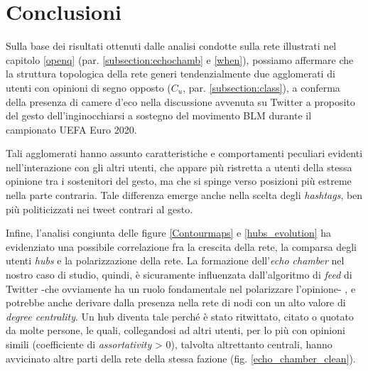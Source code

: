 \section{Conclusioni}

    Sulla base dei risultati ottenuti dalle analisi condotte sulla rete illustrati nel capitolo \ref{openq} (par. \ref{subsection:echochamb} e \ref{when}), possiamo affermare che la struttura topologica della rete generi tendenzialmente due agglomerati di utenti con opinioni di segno opposto ($C_{u}$, par. \ref{subsection:class}), a conferma della presenza di camere d'eco nella discussione avvenuta su Twitter a proposito del gesto dell'inginocchiarsi a sostegno del movimento BLM durante il campionato UEFA Euro 2020. 
    
    Tali agglomerati hanno assunto caratteristiche e comportamenti peculiari evidenti nell'interazione con gli altri utenti, che appare più ristretta a utenti della stessa opinione tra i sostenitori del gesto, ma che si spinge verso posizioni più estreme nella parte contraria. Tale differenza emerge anche nella scelta degli \textit{hashtags}, ben più politicizzati nei tweet contrari al gesto.
    
    Infine, l'analisi congiunta delle figure \ref{Contourmaps} e \ref{hubs_evolution} ha evidenziato una possibile correlazione fra la crescita della rete, la comparsa degli utenti \textit{hubs} e la polarizzazione della rete. La formazione dell'\textit{echo chamber} nel nostro caso di studio, quindi, è sicuramente influenzata dall'algoritmo di \textit{feed} di Twitter \cite{Cinellie2023301118} -che ovviamente ha un ruolo fondamentale nel polarizzare l'opinione- , e potrebbe anche derivare dalla presenza nella rete di nodi con un alto valore di \textit{degree centrality}. Un hub diventa tale perché è stato ritwittato, citato o quotato da molte persone, le quali, collegandosi ad altri utenti, per lo più con opinioni simili (coefficiente di \textit{assortativity} > 0), talvolta altrettanto centrali, hanno avvicinato altre parti della rete della stessa fazione (fig. \ref{echo_chamber_clean}). 
    